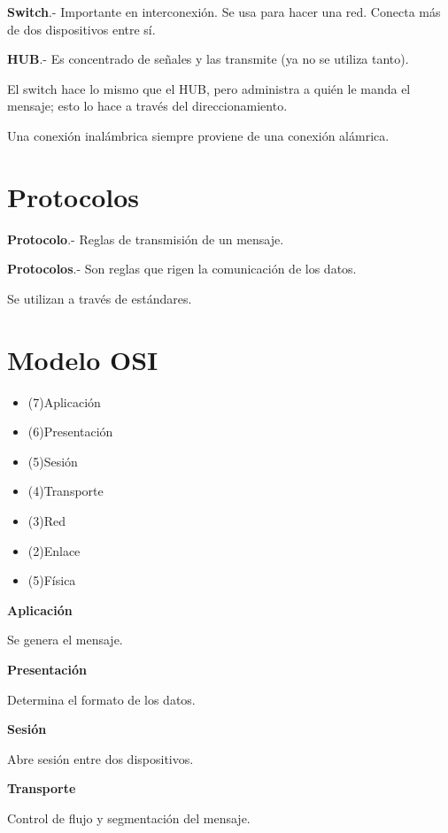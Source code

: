\documentclass{article}
\begin{document}
\textbf{Switch}.- Importante en interconexión. Se usa para hacer una red. Conecta
más de dos dispositivos entre sí.

\textbf{HUB}.- Es concentrado de señales y las transmite (ya no se utiliza tanto).

El switch hace lo mismo que el HUB, pero administra a quién le manda el mensaje;
esto lo hace a través del direccionamiento.

Una conexión inalámbrica siempre proviene de una conexión alámrica.

\section{Protocolos}

\textbf{Protocolo}.- Reglas de transmisión de un mensaje.

\textbf{Protocolos}.- Son reglas que rigen la comunicación de los datos.

Se utilizan a través de estándares.

\section{Modelo OSI}

\begin{itemize}
	\item
	(7)Aplicación
	\item
	(6)Presentación
	\item
	(5)Sesión
	\item
	(4)Transporte
	\item
	(3)Red
	\item
	(2)Enlace
	\item
	(5)Física
\end{itemize}

\textbf{Aplicación}
\vspace{1em}

Se genera el mensaje.

\textbf{Presentación}
\vspace{1em}

Determina el formato de los datos.

\textbf{Sesión}
\vspace{1em}

Abre sesión entre dos dispositivos.

\textbf{Transporte}
\vspace{1em}

Control de flujo y segmentación del mensaje.
\end{document}
